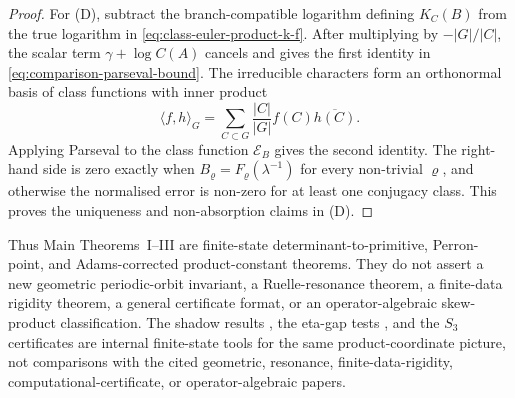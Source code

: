 \documentclass[11pt,a4paper]{amsart}
\theoremstyle{plain}
\theoremstyle{definition}
\theoremstyle{remark}
\begin{document}
\begin{proof}
  For \textup{(D)}, subtract the branch-compatible logarithm defining
  \(K_C(B)\) from the true logarithm in \eqref{eq:class-euler-product-k-f}.
  After multiplying by \(-|G|/|C|\), the scalar term
  \(\gamma+\log C(A)\) cancels and gives the first identity in
  \eqref{eq:comparison-parseval-bound}.  The irreducible characters form an
  orthonormal basis of class functions with inner product
  \[
    \langle f,h\rangle_G=
    \sum_{C\subset G}\frac{|C|}{|G|}f(C)\overline{h(C)}.
  \]
  Applying Parseval to the class function \(\mathscr E_B\) gives the second
  identity.  The right-hand side is zero exactly when
  \(B_\varrho=F_\varrho(\lambda^{-1})\) for every non-trivial
  \(\varrho\), and otherwise the normalised error is non-zero for at least
  one conjugacy class.  This proves the uniqueness and non-absorption claims
  in \textup{(D)}.

\end{proof}

Thus Main Theorems~I--III are finite-state determinant-to-primitive,
Perron-point, and Adams-corrected product-constant theorems.  They do not
assert a new geometric periodic-orbit invariant, a Ruelle-resonance theorem, a
finite-data rigidity theorem, a general certificate format, or an
operator-algebraic skew-product classification.  The shadow results
, the eta-gap tests
, and the \(S_3\) certificates
are internal finite-state tools for the same product-coordinate picture,
not comparisons with the cited geometric, resonance, finite-data-rigidity,
computational-certificate, or operator-algebraic papers.
\end{document}
